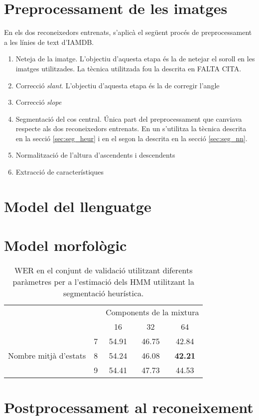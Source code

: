 \section{Preprocessament de les imatges}
En els dos reconeixedors entrenats, s'aplicà el següent procés de preprocessament a les línies de text d'IAMDB.
\begin{enumerate}
\item Neteja de la imatge. L'objectiu d'aquesta etapa és la de netejar el soroll en les imatges utilitzades. La tècnica utilitzada fou la descrita en FALTA CITA.%
\item Correcció \emph{slant}. L'objectiu d'aquesta etapa és la de corregir l'angle 
\item Correcció \emph{slope}
\item Segmentació del cos central. Única part del preprocessament que canviava respecte als dos reconeixedors entrenats. En un s'utilitza la tècnica descrita en la secció \ref{sec:seg_heur} i en el segon la descrita en la secció \ref{sec:seg_nn}.
\item Normalització de l'altura d'ascendents i descendents
\item Extracció de característiques
\end{enumerate}

\section{Model del llenguatge}

\section{Model morfològic}

\begin{table}
\centering
\begin{tabular}{cc|c|c|c|}
\cline{3-5}
& & \multicolumn{3}{c|}{Components de la mixtura} \\
\cline{3-5}
& & 16 & 32 & 64 \\ 
\cline{1-5}
\multicolumn{1}{|c|}{\multirow{3}{*}{Nombre mitjà d'estats}} & 7 &  54.91 & 46.75 & 42.84 \\
\cline{2-5}
\multicolumn{1}{|c|}{} & 8 &  54.24 & 46.08 & \textbf{42.21} \\
\cline{2-5}
\multicolumn{1}{|c|}{} & 9 &  54.41 & 47.73 & 44.53 \\
\cline{1-5}
\end{tabular}
\caption{WER en el conjunt de validació utilitzant diferents paràmetres per a l'estimació dels HMM utilitzant la segmentació heurística.}\label{table:estimacio_parametres_HMM}
\end{table} 

\section{Postprocessament al reconeixement}